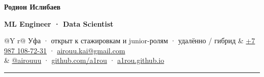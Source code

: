 \documentclass[10pt,a4paper]{article}
\begin{document}
\color{ink}

{\displayfont\fontsize{25}{29}\selectfont\bfseries Родион Ислибаев}\par
\vspace{2pt}
{\color{accent}\fontsize{12}{15}\selectfont\bfseries ML Engineer \;·\; Data Scientist}\par
\vspace{7pt}
\begin{tabularx}{\linewidth}{@{}Y r@{}}
\color{slate}\fontsize{9}{11}\selectfont Уфа \;·\; открыт к стажировкам и junior-ролям \;·\; удалённо / гибрид &
\fontsize{8.8}{11}\selectfont \href{tel:+79871087231}{+7 987 108-72-31} \;·\; \href{mailto:airouu.kai@gmail.com}{airouu.kai@gmail.com} \\
& \fontsize{8.8}{11}\selectfont \href{https://t.me/airouuu}{@airouuu} \;·\; \href{https://github.com/a1rou}{github.com/a1rou} \;·\; \href{https://a1rou.github.io/}{a1rou.github.io}
\end{tabularx}
\vspace{8pt}\color{line}\rule{\linewidth}{0.8pt}\color{ink}
\end{document}

